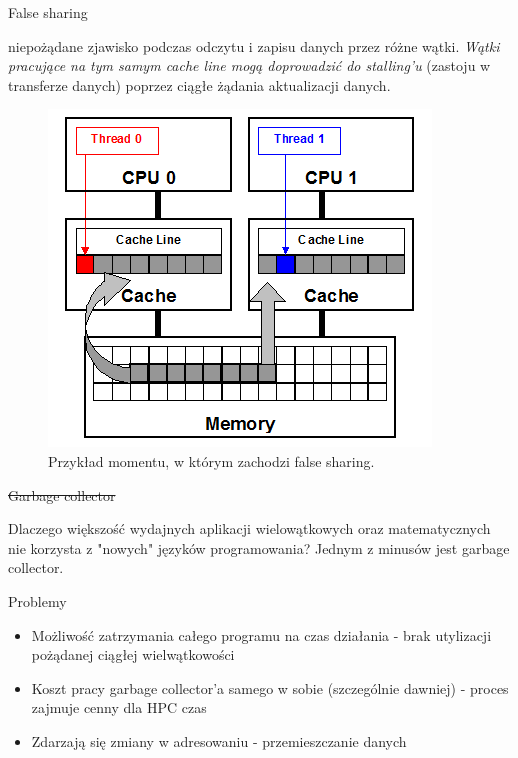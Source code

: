 \documentclass{if-beamer}
\begin{document}
\begin{frame}{False sharing}

\textbf{} niepożądane zjawisko podczas odczytu i zapisu danych przez różne wątki. \emph{Wątki pracujące na tym samym cache line mogą doprowadzić do stalling'u} (zastoju w transferze danych) poprzez ciągłe żądania aktualizacji danych.

\begin{figure}
\centering
\includegraphics[scale=0.4]{false-sharing.png}
\caption{Przykład momentu, w którym zachodzi false sharing.}
\end{figure}
  
\end{frame} 

\begin{frame}{\sout{Garbage collector}}

Dlaczego większość wydajnych aplikacji wielowątkowych oraz matematycznych nie korzysta z "nowych" języków programowania? Jednym z minusów jest garbage collector.

\begin{alertblock}{Problemy}
\begin{itemize}
  \item Możliwość zatrzymania całego programu na czas działania - brak utylizacji pożądanej ciągłej wielwątkowości
  \item Koszt pracy garbage collector'a samego w sobie (szczególnie dawniej) - proces zajmuje cenny dla HPC czas 
  \item Zdarzają się zmiany w adresowaniu - przemieszczanie danych
\end{itemize}
\end{alertblock}
  
\end{frame} 
\end{document}
